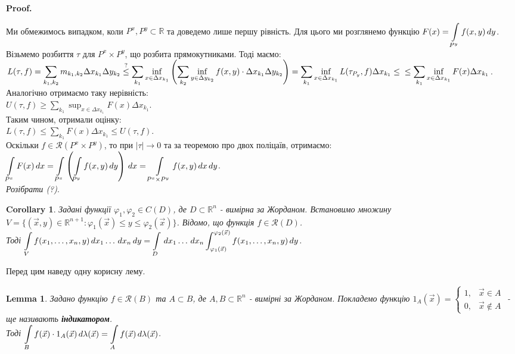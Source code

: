 \documentclass[a4paper, 10pt]{article}
\makeatletter
\def\huge{\displaystyle}
\def\qed{$\blacksquare$}
\theoremstyle{theoremdd}
\theoremstyle{theoremdd}
\theoremstyle{theoremdd}
\theoremstyle{theoremdd}
\theoremstyle{theoremdd}
\theoremstyle{theoremdd}
\theoremstyle{theoremdd}
\newtheorem{lemma}[theorem]{Lemma}
\theoremstyle{theoremdd}
\newtheorem{corollary}[theorem]{Corollary}
\renewenvironment{proof}[1][Proof.\\]{\par
\pushQED{\hfill \qed}%
\normalfont \topsep6\p@\@plus6\p@\relax
\trivlist
\item\relax
{\bfseries
#1\@addpunct{.}}\hspace\labelsep\ignorespaces
}{%
\popQED\endtrivlist\@endpefalse
}
\makeatother
\begin{document}
\begin{proof}
Ми обмежимось випадком, коли $P^x,P^y \subset \mathbb{R}$ та доведемо лише першу рівність. Для цього ми розглянемо функцію $F(x) = \huge\int\displaylimits_{P^y} f(x,y)\,dy$.\\
Візьмемо розбиття $\tau$ для $P^x \times P^y$, що розбита прямокутниками. Тоді маємо:\\
$L(\tau,f) = \huge\sum_{k_1,k_2} m_{k_1,k_2} \Delta x_{k_1} \Delta y_{k_2} \overset{?}{\leq} \sum_{k_1} \inf_{x \in \Delta x_{k_1}} \left( \sum_{k_2} \inf_{y \in \Delta y_{k_2}} f(x,y) \cdot \Delta x_{k_1} \Delta y_{k_2} \right) = \sum_{k_1} \inf_{x \in \Delta x_{k_1}} L(\tau_{P_y},f) \Delta x_{k_1} \leq \\
\leq \sum_{k_1} \inf_{x \in \Delta x_{k_1}} F(x) \Delta x_{k_1}$.\\
Аналогічно отримаємо таку нерівність:\\
$U(\tau,f) \geq \huge\sum_{k_1} \sup_{x \in \Delta x_{k_1}} F(x)\Delta x_{k_1}$.\\
Таким чином, отримали оцінку:\\
$L(\tau,f) \leq \huge\sum_{k_1} F(x)\Delta x_{k_1} \leq U(\tau,f)$.\\
Оскільки $f \in \mathcal{R}(P^x \times P^y)$, то при $|\tau| \to 0$ та за теоремою про двох поліцаїв, отримаємо:\\
$\huge\int\displaylimits_{P^x} F(x)\,dx = \int\displaylimits_{P^x} \left(\int\displaylimits_{P^y} f(x,y)\,dy \right) \,dx = \int\displaylimits_{P^x \times P^y} f(x,y)\,dx\,dy$.\\
\textit{Розібрати (?)}.
\end{proof}

\begin{corollary}
Задані функції $\varphi_1,\varphi_2 \in C(D)$, де $D \subset \mathbb{R}^n$ - вимірна за Жорданом. Встановимо множину $V = \{(\vec{x},y) \in \mathbb{R}^{n+1}: \varphi_1(\vec{x}) \leq y \leq \varphi_2(\vec{x})\}$. Відомо, що функція $f \in \mathcal{R}(D)$.\\
Тоді $\huge\int\displaylimits_V f(x_1,\dots,x_n,y)\,dx_1\dots \,dx_n\,dy = \int\displaylimits_D \,dx_1 \dots \,dx_n \int_{\varphi_1(\vec{x})}^{\varphi_2(\vec{x})} f(x_1,\dots,x_n,y)\,dy$.
\end{corollary}

Перед цим наведу одну корисну лему.\\
\begin{lemma}
Задано функцію $f \in \mathcal{R}(B)$ та $A \subset B$, де $A,B \subset \mathbb{R}^n$ - вимірні за Жорданом. Покладемо функцію $1_A(\vec{x}) = \begin{cases} 1, & \vec{x} \in A \\ 0, & \vec{x} \not\in A \end{cases}$ - ще називають \textbf{індикатором}.\\
Тоді $\huge\int\displaylimits_B f(\vec{x}) \cdot 1_{A}(\vec{x})\,d \lambda(\vec{x}) = \int\displaylimits_A f(\vec{x})\,d\lambda(\vec{x})$.
\end{lemma}
\end{document}
